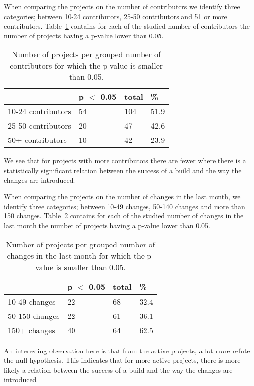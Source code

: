 When comparing the projects on the number of contributors we identify three categories; between 10-24 contributors, 25-50 contributors and 51 or more contributors.
Table~\ref{tab:p-for-contributors} contains for each of the studied number of contributors the number of projects having a p-value lower than 0.05.
\begin{table}[h]
\begin{tabular}{ l | l l l}
 & p $<$ 0.05 & total & \%\\
\hline
10-24 contributors & 54 & 104 & 51.9\\
25-50 contributors & 20 & 47 & 42.6 \\
50+ contributors & 10 & 42 & 23.9
\end{tabular}
\caption{Number of projects per grouped number of contributors for which the p-value is smaller than 0.05.}
\label{tab:p-for-contributors}
\end{table}
We see that for projects with more contributors there are fewer where there is a statistically significant relation between the success of a build and the way the changes are introduced.

When comparing the projects on the number of changes in the last month, we identify three categories; between 10-49 changes, 50-140 changes and more than 150 changes.
Table~\ref{tab:p-for-changes} contains for each of the studied number of changes in the last month the number of projects having a p-value lower than 0.05.
\begin{table}[h]
\begin{tabular}{ l | l l l}
 & p $<$ 0.05 & total & \%\\
\hline
10-49 changes & 22 & 68 & 32.4\\
50-150 changes & 22 & 61 & 36.1 \\
150+ changes & 40 & 64 & 62.5
\end{tabular}
\caption{Number of projects per grouped number of changes in the last month for which the p-value is smaller than 0.05.}
\label{tab:p-for-changes}
\end{table}
An interesting observation here is that from the active projects, a lot more refute the null hypothesis. 
This indicates that for more active projects, there is more likely a relation between the success of a build and the way the changes are introduced.





















